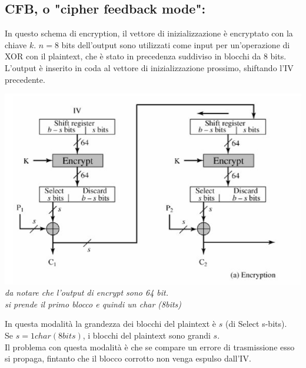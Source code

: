 \documentclass[11pt, oneside]{article}   	%
\begin{document}
\subsection*{CFB, o "cipher feedback mode":}
In questo schema di encryption, il vettore di inizializzazione è encryptato con la chiave $k$. $n = 8$ bits dell'output sono utilizzati come input per un'operazione di XOR con il plaintext, che è stato in precedenza suddiviso in blocchi da 8 bits. L'output è inserito in coda al vettore di inizializzazione prossimo, shiftando l'IV precedente.
\begin{center}
\includegraphics[scale= 0.7]{cfb}\\
\emph{da notare che l'output di encrypt sono 64 bit. \\si prende il primo blocco e quindi un char (8bits)}
\end{center}
In questa modalità la grandezza dei blocchi del plaintext è $s$ (di Select s-bits). \\Se $s = 1 char (8 bits)$, i blocchi del plaintext sono grandi $s$. \\
Il problema con questa modalità è che se compare un errore di trasmissione esso si propaga, fintanto che il blocco corrotto non venga espulso dall'IV.
\end{document}
